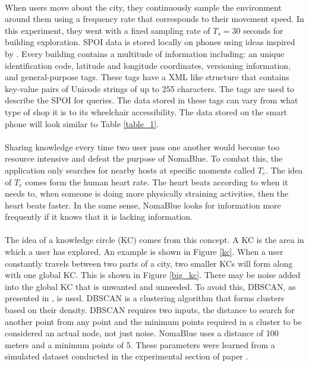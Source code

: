 \documentclass[a4paper,12pt]{article}
\begin{document}
\paragraph{}
When users move about the city, they continuously sample the environment around them using a frequency rate that corresponds to their movement speed. In this experiment, they went with a fixed sampling rate of $T_s = 30$ seconds for building exploration. SPOI data is stored locally on phones using ideas inspired by \cite{openstreetmap}. Every building contains a multitude of information including: an unique identification code, latitude and longitude coordinates, versioning information, and general-purpose tags. These tags have a XML like structure that contains key-value pairs of Unicode strings of up to 255 characters. The tags are used to describe the SPOI for queries. The data stored in these tags can vary from what type of shop it is to its wheelchair accessibility. The data stored on the smart phone will look similar to Table \ref{table_1}.
\paragraph{}
Sharing knowledge every time two user pass one another would become too resource intensive and defeat the purpose of NomaBlue. To combat this, the application only searches for nearby hosts at specific moments called $T_e$. The idea of $T_e$ comes form the human heart rate. The heart beats according to when it needs to, when someone is doing more physically straining activities, then the heart beats faster. In the same sense, NomaBlue looks for information more frequently if it knows that it is lacking information. 
\paragraph{}
The idea of a knowledge circle (KC) comes from this concept. A KC is the area in which a user has explored. An example is shown in Figure \ref{kc}. When a user constantly travels between two parts of a city, two smaller KCs will form along with one global KC. This is shown in Figure \ref{big_kc}. There may be noise added into the global KC that is unwanted and unneeded. To avoid this, DBSCAN, as presented in \cite{DBSCAN}, is used. DBSCAN is a clustering algorithm that forms clusters based on their density. DBSCAN requires two inputs, the distance to search for another point from any point and the minimum points required in a cluster to be considered an actual node, not just noise. NomaBlue uses a distance of 100 meters and a minimum points of 5. These parameters were learned from a simulated dataset conducted in the experimental section of paper \cite{SC}. 
\end{document}
